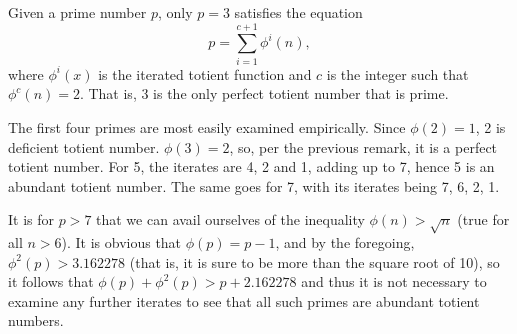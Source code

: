 \documentclass[12pt]{article}
\begin{document}
Given a prime number $p$, only $p = 3$ satisfies the equation $$p = \sum_{i = 1}^{c + 1} \phi^i(n),$$ where $\phi^i(x)$ is the iterated totient function and $c$ is the integer such that $\phi^c(n) = 2$. That is, 3 is the only perfect totient number that is prime.

The first four primes are most easily examined empirically. Since $\phi(2) = 1$, 2 is deficient totient number. $\phi(3) = 2$, so, per the previous remark, it is a perfect totient number. For 5, the iterates are 4, 2 and 1, adding up to 7, hence 5 is an abundant totient number. The same goes for 7, with its iterates being 7, 6, 2, 1.

It is for $p > 7$ that we can avail ourselves of the inequality $\phi(n) > \sqrt{n}$ (true for all $n > 6$). It is obvious that $\phi(p) = p - 1$, and by the foregoing, $\phi^2(p) > 3.162278$ (that is, it is sure to be more than the square root of 10), so it follows that $\phi(p) + \phi^2(p) > p + 2.162278$ and thus it is not necessary to examine any further iterates to see that all such primes are abundant totient numbers.
\end{document}

